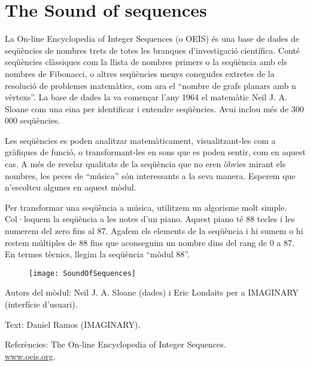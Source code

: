 \section{The Sound of sequences}
La  On-line Encyclopedia of Integer Sequences (o OEIS) és una base de dades de seqüències de nombres trets de totes les branques d'investigació científica. Conté seqüències clàssiques com la llista de nombres primers o la seqüència amb els nombres de Fibonacci, o altres seqüències menys conegudes extretes de la resolució de problemes matemàtics, com ara el ``nombre de grafs planars amb n vèrtexs''. La base de dades la va començar l'any 1964 el matemàtic Neil J. A. Sloane com una eina per identificar i entendre seqüències. Avui inclou més de 300 000 seqüències.  

Les seqüències es poden analitzar matemàticament, visualitzant-les com a gràfiques de funció, o transformant-les en sons que es poden sentir, com en aquest cas. A més de revelar qualitats de la seqüència que no eren òbvies mirant els nombres, les peces de ``música'' són interessants a la seva manera. Esperem que n'escolteu algunes en aquest mòdul.  

Per transformar una seqüència a música, utilitzem un algorisme molt simple. Col·loquem la seqüència a les notes d'un piano. Aquest piano té 88 tecles i les numerem del zero fins al 87. Agafem els elements de la seqüència i hi sumem o hi restem múltiples de 88 fins que aconseguim un nombre dins del rang de 0 a 87. En termes tècnics, llegim la seqüència ``mòdul 88''.

\begin{figure}[h]
\centering
\texttt{[image: SoundOfSequences]}
\end{figure}

\begin{sectcredits}
\item[Autors del mòdul:] Neil J. A. Sloane (dades) i Eric Londaits per a IMAGINARY (interfície d'usuari).
\item[Text:] Daniel Ramos (IMAGINARY).

\item[Referències:]
The On-line Encyclopedia of Integer Sequences.\\ \url{www.oeis.org}.
\end{sectcredits}
